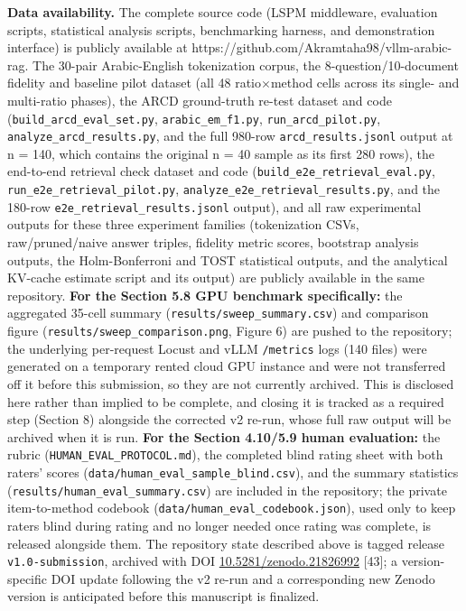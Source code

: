 \textbf{Data availability.} The complete source code (LSPM middleware, evaluation scripts, statistical analysis scripts, benchmarking harness, and demonstration interface) is publicly available at https://github.com/Akramtaha98/vllm-arabic-rag. The 30-pair Arabic-English tokenization corpus, the 8-question/10-document fidelity and baseline pilot dataset (all 48 ratio$\times$method cells across its single- and multi-ratio phases), the ARCD ground-truth re-test dataset and code (\texttt{build\_arcd\_eval\_set.py}, \texttt{arabic\_em\_f1.py}, \texttt{run\_arcd\_pilot.py}, \texttt{analyze\_arcd\_results.py}, and the full 980-row \texttt{arcd\_results.jsonl} output at n = 140, which contains the original n = 40 sample as its first 280 rows), the end-to-end retrieval check dataset and code (\texttt{build\_e2e\_retrieval\_eval.py}, \texttt{run\_e2e\_retrieval\_pilot.py}, \texttt{analyze\_e2e\_retrieval\_results.py}, and the 180-row \texttt{e2e\_retrieval\_results.jsonl} output), and all raw experimental outputs for these three experiment families (tokenization CSVs, raw/pruned/naive answer triples, fidelity metric scores, bootstrap analysis outputs, the Holm-Bonferroni and TOST statistical outputs, and the analytical KV-cache estimate script and its output) are publicly available in the same repository. \textbf{For the Section 5.8 GPU benchmark specifically:} the aggregated 35-cell summary (\texttt{results/sweep\_summary.csv}) and comparison figure (\texttt{results/sweep\_comparison.png}, Figure 6) are pushed to the repository; the underlying per-request Locust and vLLM \texttt{/metrics} logs (140 files) were generated on a temporary rented cloud GPU instance and were not transferred off it before this submission, so they are not currently archived. This is disclosed here rather than implied to be complete, and closing it is tracked as a required step (Section 8) alongside the corrected v2 re-run, whose full raw output will be archived when it is run. \textbf{For the Section 4.10/5.9 human evaluation:} the rubric (\texttt{HUMAN\_EVAL\_PROTOCOL.md}), the completed blind rating sheet with both raters' scores (\texttt{data/human\_eval\_sample\_blind.csv}), and the summary statistics (\texttt{results/human\_eval\_summary.csv}) are included in the repository; the private item-to-method codebook (\texttt{data/human\_eval\_codebook.json}), used only to keep raters blind during rating and no longer needed once rating was complete, is released alongside them. The repository state described above is tagged release \texttt{v1.0-submission}, archived with DOI \href{https://doi.org/10.5281/zenodo.21826992}{10.5281/zenodo.21826992} [43]; a version-specific DOI update following the v2 re-run and a corresponding new Zenodo version is anticipated before this manuscript is finalized.


